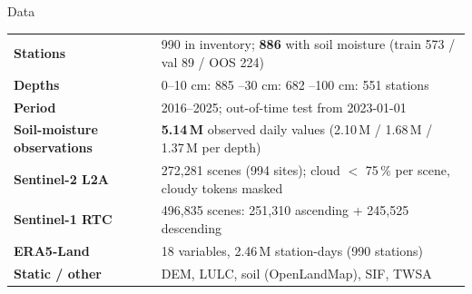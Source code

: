\begin{frame}{Data}
\centering\small
\renewcommand{\arraystretch}{1.3}
\begin{tabular}{@{}l l@{}}
\toprule
\textbf{Stations} & 990 in inventory; \textbf{886} with soil moisture (train 573 / val 89 / OOS 224) \\
\textbf{Depths} & 0--10 cm: 885 \quad 10--30 cm: 682 \quad 30--100 cm: 551 stations \\
\textbf{Period} & 2016--2025; out-of-time test from 2023-01-01 \\
\textbf{Soil-moisture observations} & \textbf{5.14\,M} observed daily values (2.10\,M / 1.68\,M / 1.37\,M per depth) \\
\textbf{Sentinel-2 L2A} & 272,281 scenes (994 sites); cloud $<$ 75\,\% per scene, cloudy tokens masked \\
\textbf{Sentinel-1 RTC} & 496,835 scenes: 251,310 ascending + 245,525 descending \\
\textbf{ERA5-Land} & 18 variables, 2.46\,M station-days (990 stations) \\
\textbf{Static / other} & DEM, LULC, soil (OpenLandMap), SIF, TWSA \\
\bottomrule
\end{tabular}
\end{frame}

